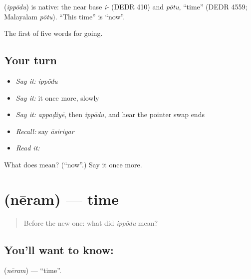 \begin{cousinweb}
\textbf{} (\emph{ippōdu}) is native: the near base \emph{i-} (DEDR 410) and \emph{pōtu}, \textquotedblleft{}time\textquotedblright{} (DEDR 4559; Malayalam \emph{pōtu}). \textquotedblleft{}This time\textquotedblright{} is \textquotedblleft{}now\textquotedblright{}.
\end{cousinweb}

\begin{grammarlens}[title={What you've built}]
The first of five words for going.
\end{grammarlens}

\subsection*{Your turn}
\begin{itemize}
\raggedright
  \item \emph{Say it:} \emph{ippōdu}
  \item \emph{Say it:} it once more, slowly
  \item \emph{Say it:} \emph{appaḍiyē}, then \emph{ippōdu}, and hear the pointer swap ends
  \item \emph{Recall:} say \emph{āsiriyar}
  \item \emph{Read it:} \textbf{}
\end{itemize}

\begin{tcolorbox}[breakable,colback=teal!4,colframe=teal!35!black,title={Before you move on}]
What does  mean? (\textquotedblleft{}now\textquotedblright{}.) Say it once more.
\end{tcolorbox}
\section[\texorpdfstring{\ta{நேரம்} (nēram)}{நேரம் (nēram)}]{ (nēram) — time}

\label{lesson:TA-C48-time}



\begin{quote}
Before the new one: what did \emph{ippōdu} mean?
\end{quote}

\subsection*{You'll want to know: }
\textbf{} (\emph{nēram}) — \textquotedblleft{}time\textquotedblright{}.

